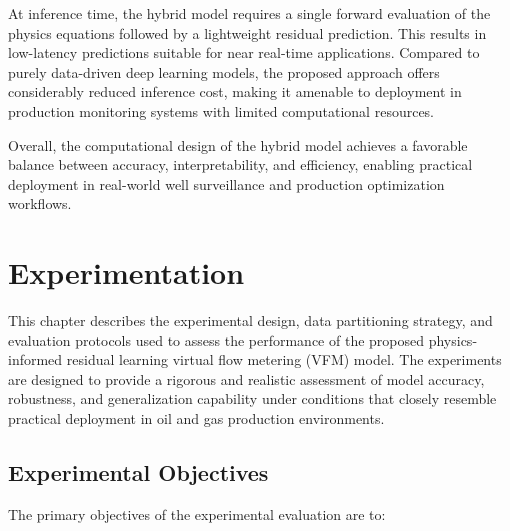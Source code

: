 \documentclass[12pt,APA]{uomthesis}
\begin{document}
At inference time, the hybrid model requires a single forward evaluation of the physics equations followed by a lightweight residual prediction. This results in low-latency predictions suitable for near real-time applications. Compared to purely data-driven deep learning models, the proposed approach offers considerably reduced inference cost, making it amenable to deployment in production monitoring systems with limited computational resources.

Overall, the computational design of the hybrid model achieves a favorable balance between accuracy, interpretability, and efficiency, enabling practical deployment in real-world well surveillance and production optimization workflows.


\chapter{Experimentation}
\label{ch:experimentation}

This chapter describes the experimental design, data partitioning strategy, and evaluation protocols used to assess the performance of the proposed physics-informed residual learning virtual flow metering (VFM) model. The experiments are designed to provide a rigorous and realistic assessment of model accuracy, robustness, and generalization capability under conditions that closely resemble practical deployment in oil and gas production environments.

\section{Experimental Objectives}
\label{sec:experimentation_objectives}
The primary objectives of the experimental evaluation are to:
\end{document}
